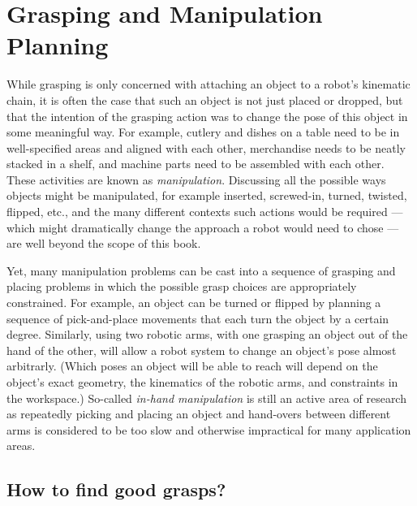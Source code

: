\chapter{Grasping and Manipulation Planning}\label{chap:manipulation}
While grasping is only concerned with attaching an object to a robot's kinematic chain, it is often the case that such an object is not just placed or dropped, but that the intention of the grasping action was to change the pose of this object in some meaningful way. For example, cutlery and dishes on a table need to be in well-specified areas and aligned with each other, merchandise needs to be neatly stacked in a shelf, and machine parts need to be assembled with each other. These activities are known as \emph{manipulation}. Discussing all the possible ways objects might be manipulated, for example inserted, screwed-in, turned, twisted, flipped, etc., and the many different contexts such actions would be required --- which might dramatically change the approach a robot would need to chose --- are well beyond the scope of this book.

Yet, many manipulation problems can be cast into a sequence of grasping and placing problems in which the possible grasp choices are appropriately constrained. For example, an object can be turned or flipped by planning a sequence of pick-and-place movements that each turn the object by a certain degree. Similarly, using two robotic arms, with one grasping an object out of the hand of the other, will allow a robot system to change an object's pose almost arbitrarly. (Which poses an object will be able to reach will depend on the object's exact geometry, the kinematics of the robotic arms, and constraints in the workspace.) So-called \emph{in-hand manipulation} is still an active area of research as  repeatedly picking and placing an object and hand-overs between different arms is considered to be too slow and otherwise impractical for many application areas.  

\section{How to find good grasps?}

